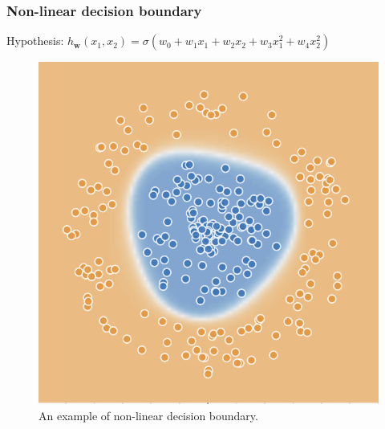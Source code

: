 \documentclass{beamer}
\begin{document}
	\begin{frame}
		\frametitle{Non-linear decision boundary}
		Hypothesis: $h_{\bm{w}}(x_1, x_2) = \sigma(w_0 + w_1 x_1 + w_2 x_2 + w_3 x_1^2 + w_4 x_2^2)$
		\begin{figure}
			\centering
			\includegraphics[scale=0.8]{images/non-linear-decision-boundary}
			\caption{An example of non-linear decision boundary.}
		\end{figure}
	\end{frame}
\end{document}
